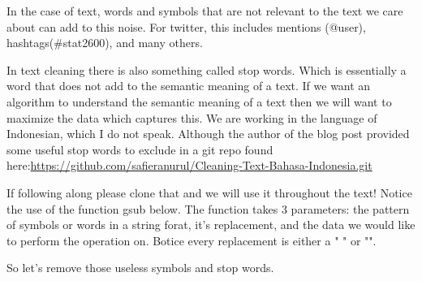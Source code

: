 \documentclass[
]{article}
\begin{document}
In the case of text, words and symbols that are not relevant to the text
we care about can add to this noise. For twitter, this includes mentions
(@user), hashtags(\#stat2600), and many others.

In text cleaning there is also something called stop words. Which is
essentially a word that does not add to the semantic meaning of a text.
If we want an algorithm to understand the semantic meaning of a text
then we will want to maximize the data which captures this. We are
working in the language of Indonesian, which I do not speak. Although
the author of the blog post provided some useful stop words to exclude
in a git repo found
here:\url{https://github.com/safieranurul/Cleaning-Text-Bahasa-Indonesia.git}

If following along please clone that and we will use it throughout the
text! Notice the use of the function gsub below. The function takes 3
parameters: the pattern of symbols or words in a string forat, it's
replacement, and the data we would like to perform the operation on.
Botice every replacement is either a " " or "".

So let's remove those useless symbols and stop words.
\end{document}
